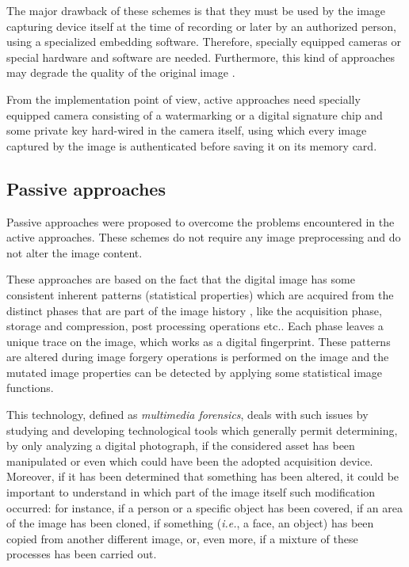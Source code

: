 The major drawback of these schemes is that they must be used by the image capturing device itself at the time of recording or later by an authorized person, using a specialized embedding software. Therefore, specially equipped cameras or special hardware and software are needed. Furthermore, this kind of approaches may degrade the quality of the original image \cite{van2007survey}.

From the implementation point of view, active approaches need specially equipped camera consisting of a watermarking or a digital signature chip and some private key hard-wired in the camera itself, using which every image captured by the image is authenticated before saving it on its memory card. 

\subsection{Passive approaches}

Passive approaches\cite{ng2006passive} were proposed to overcome the problems encountered in the active approaches. These schemes do not require any image preprocessing and do not alter the image content.  

These approaches are based on the fact that the digital image has some consistent inherent
patterns (statistical properties) which are acquired from the distinct phases that are part of the image history \cite{piva2013overview}, like the acquisition phase, storage and compression, post processing operations etc.. Each phase leaves a unique trace on the image, which works as a digital fingerprint.
These patterns are altered during image forgery operations is performed on the image and the mutated image properties can be detected by applying some statistical image functions.

This technology, defined as \emph{multimedia forensics}\cite{farid2009image}\cite{van2007survey}\cite{mahdian2010bibliography}, deals with such issues by studying and developing technological tools which generally permit determining, by only analyzing a digital photograph, if the considered asset has been manipulated or even which could have been the adopted acquisition device. Moreover, if it has been determined that something has been altered, it could be important to understand in which part of the image itself such modification occurred: for instance, if a person or a specific object has been covered, if an area of the image has been cloned, if something (\emph{i.e.}, a face, an object) has been copied from another different image, or, even more, if a mixture of these processes has been carried out. 

